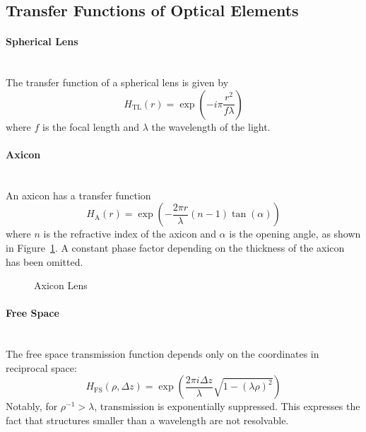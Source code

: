\subsection{Transfer Functions of Optical Elements}
\paragraph{Spherical Lens} ~\\
The transfer function of a spherical lens is given by
\begin{equation*}
    H_\text{TL}(r) = \exp\!\left(-i\pi\frac{r^2}{f\lambda}\right)
\end{equation*}
where $f$ is the focal length and $\lambda$ the wavelength of the light.

\paragraph{Axicon} ~\\
An axicon has a transfer function
\begin{equation*}
    H_\text{A}(r) = \exp\!\left(-\frac{2\pi r}{\lambda}(n - 1)\tan(\alpha)\right)
\end{equation*}
where $n$ is the refractive index of the axicon and $\alpha$ is the opening angle, as shown in Figure~\ref{fig:axicon}. A constant phase factor depending on the thickness of the axicon has been omitted.
\begin{figure}[htbp]
    \centering
    
    \caption{Axicon Lens}
    \label{fig:axicon}
\end{figure}

\paragraph{Free Space} ~\\
The free space transmission function depends only on the coordinates in reciprocal space:
\begin{equation}
    H_\text{FS}(\rho, \Delta z) = \exp\!\left(\frac{2\pi i \Delta z}{\lambda}\sqrt{1 - (\lambda \rho)^2}\right)
\end{equation}
Notably, for $\rho^{-1} > \lambda$, transmission is exponentially suppressed. This expresses the fact that structures smaller than a wavelength are not resolvable.


